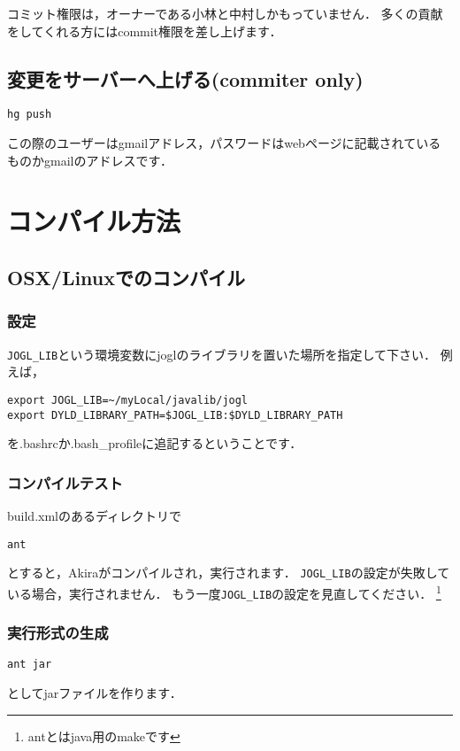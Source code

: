 \documentclass[a4j,openany]{jbook}
\begin{document}
コミット権限は，オーナーである小林と中村しかもっていません．
多くの貢献をしてくれる方にはcommit権限を差し上げます．


  \subsection{変更をサーバーへ上げる(commiter only)}
\begin{screen}
\begin{verbatim}
hg push
\end{verbatim}
\end{screen}
この際のユーザーはgmailアドレス，パスワードはwebページに記載されているものかgmailのアドレスです．

 \section{コンパイル方法}
  \subsection{OSX/Linuxでのコンパイル}
   \subsubsection{設定}
  \verb|JOGL_LIB|という環境変数にjoglのライブラリを置いた場所を指定して下さい．
  例えば，
  \begin{screen}
\begin{verbatim}
export JOGL_LIB=~/myLocal/javalib/jogl
export DYLD_LIBRARY_PATH=$JOGL_LIB:$DYLD_LIBRARY_PATH
\end{verbatim}
  \end{screen}
    を.bashrcか.bash\_profileに追記するということです．

   \subsubsection{コンパイルテスト}
    build.xmlのあるディレクトリで
    \begin{screen}
\begin{verbatim}
ant
\end{verbatim}
    \end{screen}
    とすると，Akiraがコンパイルされ，実行されます．
    \verb|JOGL_LIB|の設定が失敗している場合，実行されません．
    もう一度\verb|JOGL_LIB|の設定を見直してください．
    \footnote{antとはjava用のmakeです}

   \subsubsection{実行形式の生成}
    \begin{screen}
\begin{verbatim}
ant jar
\end{verbatim}
    \end{screen}
    としてjarファイルを作ります．
\end{document}
